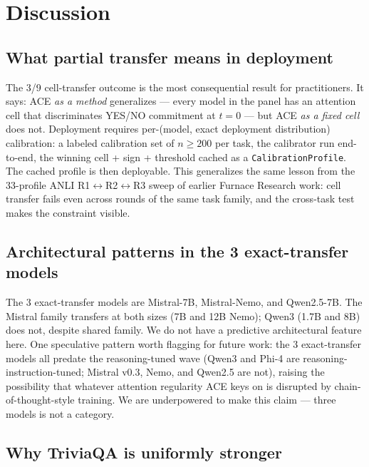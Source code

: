 \documentclass[10pt, letterpaper]{article}
\begin{document}
\section{Discussion}
\label{sec:discussion}

\subsection{What partial transfer means in deployment}

The 3/9 cell-transfer outcome is the most consequential result for
practitioners. It says: ACE \emph{as a method} generalizes --- every
model in the panel has an attention cell that discriminates YES/NO
commitment at $t{=}0$ --- but ACE \emph{as a fixed cell} does not.
Deployment requires per-(model, exact deployment distribution)
calibration: a labeled calibration set of $n \geq 200$ per task, the
calibrator run end-to-end, the winning cell + sign + threshold cached
as a \texttt{CalibrationProfile}. The cached profile is then
deployable. This generalizes the same lesson from the 33-profile
ANLI R1$\leftrightarrow$R2$\leftrightarrow$R3 sweep
of earlier Furnace Research work: cell transfer fails even
across rounds of the same task family, and the cross-task test makes
the constraint visible.

\subsection{Architectural patterns in the 3 exact-transfer models}

The 3 exact-transfer models are Mistral-7B, Mistral-Nemo, and
Qwen2.5-7B. The Mistral family transfers at both sizes (7B and 12B
Nemo); Qwen3 (1.7B and 8B) does not, despite shared family. We do
not have a predictive architectural feature here. One speculative
pattern worth flagging for future work: the 3 exact-transfer models
all predate the reasoning-tuned wave (Qwen3 and Phi-4 are
reasoning-instruction-tuned; Mistral v0.3, Nemo, and Qwen2.5 are
not), raising the possibility that whatever attention regularity ACE
keys on is disrupted by chain-of-thought-style training. We are
underpowered to make this claim --- three models is not a category.

\subsection{Why TriviaQA is uniformly stronger}
\end{document}
